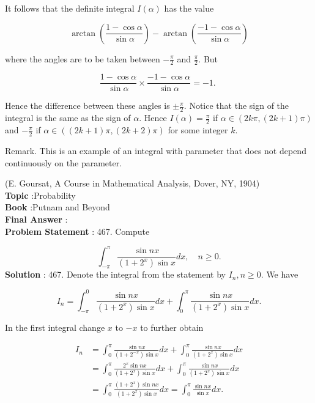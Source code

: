 \documentclass[10pt]{article}
\begin{document}
It follows that the definite integral $I(\alpha)$ has the value 

$$
\arctan \left(\frac{1-\cos \alpha}{\sin \alpha}\right)-\arctan \left(\frac{-1-\cos \alpha}{\sin \alpha}\right)
$$

where the angles are to be taken between $-\frac{\pi}{2}$ and $\frac{\pi}{2}$. But

$$
\frac{1-\cos \alpha}{\sin \alpha} \times \frac{-1-\cos \alpha}{\sin \alpha}=-1 \text {. }
$$

Hence the difference between these angles is $\pm \frac{\pi}{2}$. Notice that the sign of the integral is the same as the sign of $\alpha$. Hence $I(\alpha)=\frac{\pi}{2}$ if $\alpha \in(2 k \pi,(2 k+1) \pi)$ and $-\frac{\pi}{2}$ if $\alpha \in((2 k+1) \pi,(2 k+2) \pi)$ for some integer $k$.

Remark. This is an example of an integral with parameter that does not depend continuously on the parameter.

(E. Goursat, A Course in Mathematical Analysis, Dover, NY, 1904)
\\
\textbf{Topic} :Probability\\
\textbf{Book} :Putnam and Beyond\\
\textbf{Final Answer} :\\


\textbf{Problem Statement} :
467. Compute

$$
\int_{-\pi}^{\pi} \frac{\sin n x}{\left(1+2^{x}\right) \sin x} d x, \quad n \geq 0 .
$$
\textbf{Solution} :
467. Denote the integral from the statement by $I_{n}, n \geq 0$. We have

$$
I_{n}=\int_{-\pi}^{0} \frac{\sin n x}{\left(1+2^{x}\right) \sin x} d x+\int_{0}^{\pi} \frac{\sin n x}{\left(1+2^{x}\right) \sin x} d x .
$$

In the first integral change $x$ to $-x$ to further obtain

$$
\begin{aligned}
I_{n} &=\int_{0}^{\pi} \frac{\sin n x}{\left(1+2^{-x}\right) \sin x} d x+\int_{0}^{\pi} \frac{\sin n x}{\left(1+2^{x}\right) \sin x} d x \\
&=\int_{0}^{\pi} \frac{2^{x} \sin n x}{\left(1+2^{x}\right) \sin x} d x+\int_{0}^{\pi} \frac{\sin n x}{\left(1+2^{x}\right) \sin x} d x \\
&=\int_{0}^{\pi} \frac{\left(1+2^{x}\right) \sin n x}{\left(1+2^{x}\right) \sin x} d x=\int_{0}^{\pi} \frac{\sin n x}{\sin x} d x .
\end{aligned}
$$
\end{document}
